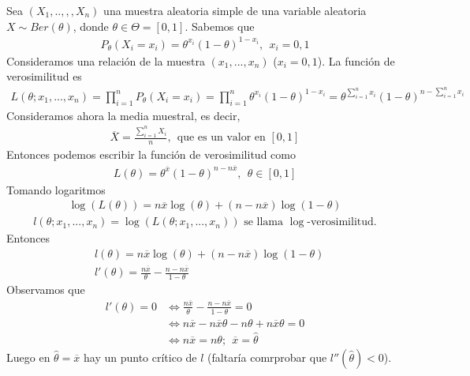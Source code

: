 \begin{ejemplo}
    Sea $(X_1,..,,,X_n)$ una muestra aleatoria simple de una variable aleatoria $X \sim Ber(\theta)$, donde $\theta \in \Theta = [0,1]$. Sabemos que
    \begin{align*}
        P_{\theta}(X_i = x_i) = \theta^{x_i}(1- \theta)^{1 - x_i}, \ \ x_i = 0,1
    \end{align*}
    Consideramos una relación de la muestra $(x_1,...,x_n)$ ($x_i = 0, 1$). La función de verosimilitud es
    \begin{align*}
        L(\theta;x_1,...,x_n) = \prod_{i=1}^{n}{P_{\theta}(X_i = x_i)} = \prod_{i=1}^{n}{\theta^{x_i}(1- \theta)^{1 - x_i}} = \theta^{\sum_{i=1}^{n}{x_i}}(1 - \theta)^{n - \sum_{i=1}^{n}{x_i}}
    \end{align*}
    Consideramos ahora la media muestral, es decir,
    \begin{align*}
        \overline{X} = \frac{\sum_{i=1}^{n}{X_i}}{n}, \ \ \text{que es un valor en } [0,1]
    \end{align*}
    Entonces podemos escribir la función de verosimilitud como
    \begin{align*}
        L(\theta) = \theta^{\overline{x}}(1- \theta)^{n - n\overline{x}}, \ \ \theta \in [0,1]
    \end{align*}
    Tomando logaritmos
    \begin{align*}
        \log(L(\theta)) = n\overline{x}\log(\theta) + (n-n\overline{x})\log(1 - \theta)
    \end{align*}
    \begin{align*}
        \boxed{
            l(\theta;x_1,...,x_n) = \log(L(\theta;x_1,...,x_n)) \text{ se llama } \log\text{-verosimilitud}.
        }
    \end{align*}
    Entonces
    \begin{align*}
         & l(\theta) = n\overline{x}\log(\theta) + (n-n\overline{x})\log(1 - \theta)        \\
         & l'(\theta) = \frac{n\overline{x}}{\theta} - \frac{n - n\overline{x}}{1 - \theta}
    \end{align*}
    Observamos que
    \begin{align*}
        l'(\theta) = 0 & \Longleftrightarrow \frac{n\overline{x}}{\theta} - \frac{n - n\overline{x}}{1 - \theta} = 0 \\
                       & \Longleftrightarrow n\overline{x} - n\overline{x}\theta - n\theta + n\overline{x}\theta = 0 \\
                       & \Longleftrightarrow n\overline{x} = n\theta; \ \ \overline{x} = \hat{\theta}
    \end{align*}
    Luego en $\hat{\theta} = \overline{x}$ hay un punto crítico de $l$ (faltaría comrprobar que $l''(\hat{\theta}) < 0$).


\end{ejemplo}
